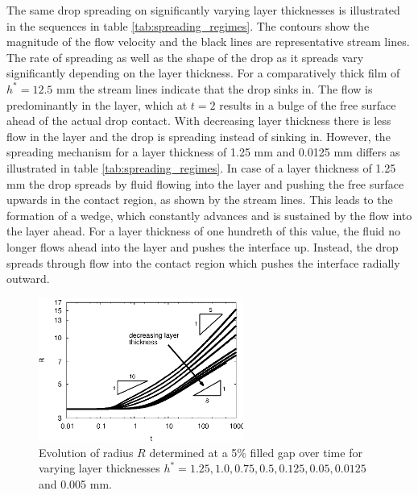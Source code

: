\documentclass[aip,graphicx]{revtex4-1}
\begin{document}
The same drop spreading on significantly varying layer thicknesses is
illustrated in the sequences in table \ref{tab:spreading_regimes}.
The contours show the magnitude of the flow velocity and the black
lines are representative stream lines.  The rate of spreading as well
as the shape of the drop as it spreads vary significantly depending on
the layer thickness.  For a comparatively thick film of $h^*=12.5$ mm
the stream lines indicate that the drop sinks in.  The flow is
predominantly in the layer, which at $t=2$ results in a bulge of the
free surface ahead of the actual drop contact.  With decreasing layer
thickness there is less flow in the layer and the drop is spreading
instead of sinking in.  However, the spreading mechanism for a layer
thickness of 1.25 mm and 0.0125 mm differs as illustrated in table
\ref{tab:spreading_regimes}.  In case of a layer thickness of 1.25 mm
the drop spreads by fluid flowing into the layer and pushing the free
surface upwards in the contact region, as shown by the stream lines.
This leads to the formation of a wedge, which constantly advances and
is sustained by the flow into the layer ahead.  For a layer thickness
of one hundreth of this value, the fluid no longer flows ahead into
the layer and pushes the interface up.  Instead, the drop spreads
through flow into the contact region which pushes the interface
radially outward. \\


\begin{figure}[!ht]
\centering
\includegraphics[width=0.6\textwidth]{figures/radius_vs_time_before_and_after_pinch_off.eps}
\caption{Evolution of radius $R$ determined at a 5\% filled gap over
  time for varying layer thicknesses $h^*=1.25, 1.0, 0.75, 0.5, 0.125,
  0.05, 0.0125$ and 0.005 mm.}
\label{fig:radius_vs_time_before_and_after_pinch_off}
\end{figure}
\end{document}
